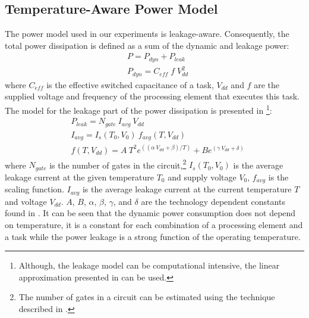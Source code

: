 \subsection{Temperature-Aware Power Model}
The power model used in our experiments is leakage-aware. Consequently, the total power dissipation is defined as a sum of the dynamic and leakage power:
\begin{align*}
  & P = P_{dyn} + P_{leak} \\
  & P_{dyn} = C_{eff} \; f \; V_{dd}^2
\end{align*}
where $C_{eff}$ is the effective switched capacitance of a task, $V_{dd}$ and $f$ are the supplied voltage and frequency of the processing element that executes this task. The model for the leakage part of the power dissipation is presented in \cite{liao2005}\footnote{Although, the leakage model can be computational intensive, the linear approximation presented in \cite{liu2007} can be used.}:
\begin{align*}
  & P_{leak} = N_{gate} \: I_{avg} \: V_{dd} \\
  & I_{avg} = I_s(T_0, V_0) \: f_{avg}(T, V_{dd}) \\
  & f(T, V_{dd}) = A \: T^2 e^{((\alpha \: V_{dd} + \beta)/T)} + B e^{(\gamma \: V_{dd} + \delta)}
\end{align*}
where $N_{gate}$ is the number of gates in the circuit,\footnote{The number of gates in a circuit can be estimated using the technique described in \cite{li2004}.} $I_s (T_0, V_0)$ is the average leakage current at the given temperature $T_0$ and supply voltage $V_0$, $f_{avg}$ is the scaling function. $I_{avg}$ is the average leakage current at the current temperature $T$ and voltage $V_{dd}$. $A$, $B$, $\alpha$, $\beta$, $\gamma$, and $\delta$ are the technology dependent constants found in \cite{liao2005}. It can be seen that the dynamic power consumption does not depend on temperature, it is a constant for each combination of a processing element and a task while the power leakage is a strong function of the operating temperature.

